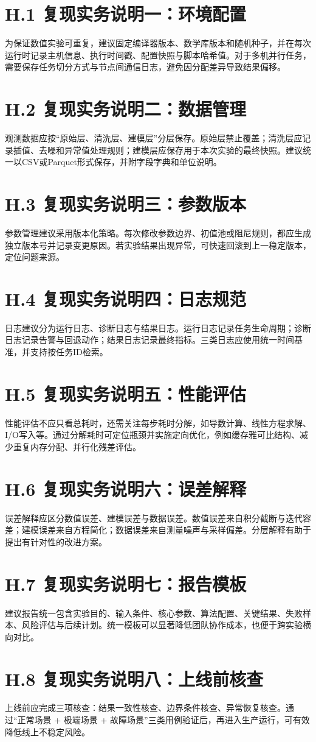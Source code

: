 \section*{H.1 复现实务说明一：环境配置}
为保证数值实验可重复，建议固定编译器版本、数学库版本和随机种子，并在每次运行时记录主机信息、执行时间戳、配置快照与脚本哈希值。对于多机并行任务，需要保存任务切分方式与节点间通信日志，避免因分配差异导致结果偏移。
\clearpage

\section*{H.2 复现实务说明二：数据管理}
观测数据应按“原始层、清洗层、建模层”分层保存。原始层禁止覆盖；清洗层应记录插值、去噪和异常值处理规则；建模层应保存用于本次实验的最终快照。建议统一以CSV或Parquet形式保存，并附字段字典和单位说明。
\clearpage

\section*{H.3 复现实务说明三：参数版本}
参数管理建议采用版本化策略。每次修改参数边界、初值池或阻尼规则，都应生成独立版本号并记录变更原因。若实验结果出现异常，可快速回滚到上一稳定版本，定位问题来源。
\clearpage

\section*{H.4 复现实务说明四：日志规范}
日志建议分为运行日志、诊断日志与结果日志。运行日志记录任务生命周期；诊断日志记录告警与回退动作；结果日志记录最终指标。三类日志应使用统一时间基准，并支持按任务ID检索。
\clearpage

\section*{H.5 复现实务说明五：性能评估}
性能评估不应只看总耗时，还需关注每步耗时分解，如导数计算、线性方程求解、I/O写入等。通过分解耗时可定位瓶颈并实施定向优化，例如缓存雅可比结构、减少重复内存分配、并行化残差评估。
\clearpage

\section*{H.6 复现实务说明六：误差解释}
误差解释应区分数值误差、建模误差与数据误差。数值误差来自积分截断与迭代容差；建模误差来自方程简化；数据误差来自测量噪声与采样偏差。分层解释有助于提出有针对性的改进方案。
\clearpage

\section*{H.7 复现实务说明七：报告模板}
建议报告统一包含实验目的、输入条件、核心参数、算法配置、关键结果、失败样本、风险评估与后续计划。统一模板可以显著降低团队协作成本，也便于跨实验横向对比。
\clearpage

\section*{H.8 复现实务说明八：上线前核查}
上线前应完成三项核查：结果一致性核查、边界条件核查、异常恢复核查。通过“正常场景 + 极端场景 + 故障场景”三类用例验证后，再进入生产运行，可有效降低线上不稳定风险。
